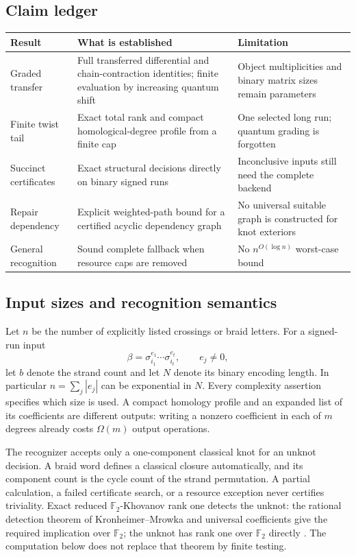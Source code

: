 \documentclass[11pt]{article}
\theoremstyle{definition}
\theoremstyle{remark}
\newcommand{\F}{\mathbb F_2}
\begin{document}
\subsection{Claim ledger}
\begin{center}
\begin{tabularx}{\textwidth}{@{}>{\raggedright\arraybackslash}p{}>{\raggedright\arraybackslash}X>{\raggedright\arraybackslash}p{}@{}}
\toprule
Result & What is established & Limitation \\
\midrule
Graded transfer & Full transferred differential and chain-contraction identities; finite evaluation by increasing quantum shift & Object multiplicities and binary matrix sizes remain parameters \\
Finite twist tail & Exact total rank and compact homological-degree profile from a finite cap & One selected long run; quantum grading is forgotten \\
Succinct certificates & Exact structural decisions directly on binary signed runs & Inconclusive inputs still need the complete backend \\
Repair dependency & Explicit weighted-path bound for a certified acyclic dependency graph & No universal suitable graph is constructed for knot exteriors \\
General recognition & Sound complete fallback when resource caps are removed & No $n^{O(\log n)}$ worst-case bound \\
\bottomrule
\end{tabularx}
\end{center}

\subsection{Input sizes and recognition semantics}
Let $n$ be the number of explicitly listed crossings or braid letters. For a signed-run input
\[
 \beta=\sigma_{i_1}^{e_1}\cdots\sigma_{i_t}^{e_t},\qquad e_j\ne0,
\]
let $b$ denote the strand count and let $N$ denote its binary encoding length. In particular $n=\sum_j|e_j|$ can be exponential in $N$. Every complexity assertion specifies which size is used. A compact homology profile and an expanded list of its coefficients are different outputs: writing a nonzero coefficient in each of $m$ degrees already costs $\Omega(m)$ output operations.

The recognizer accepts only a one-component classical knot for an unknot decision. A braid word defines a classical closure automatically, and its component count is the cycle count of the strand permutation. A partial calculation, a failed certificate search, or a resource exception never certifies triviality. Exact reduced $\F$-Khovanov rank one detects the unknot: the rational detection theorem of Kronheimer--Mrowka and universal coefficients give the required implication over $\F$; the unknot has rank one over $\F$ directly \cite{km}. The computation below does not replace that theorem by finite testing.
\end{document}
